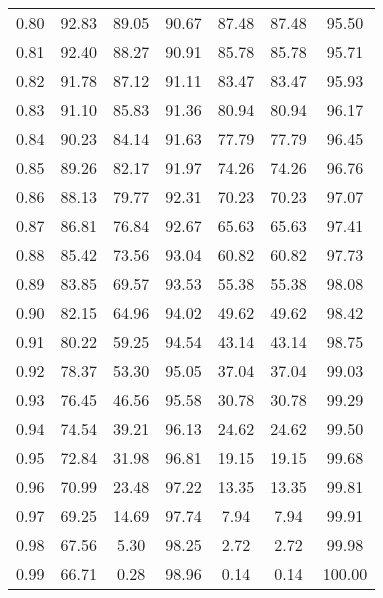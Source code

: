 \begin{tabular}{|c|c|c|c|c|c|c|}
      0.80 &     92.83 &     89.05 &      90.67 &   87.48 &      87.48 &         95.50 \\
      0.81 &     92.40 &     88.27 &      90.91 &   85.78 &      85.78 &         95.71 \\
      0.82 &     91.78 &     87.12 &      91.11 &   83.47 &      83.47 &         95.93 \\
      0.83 &     91.10 &     85.83 &      91.36 &   80.94 &      80.94 &         96.17 \\
      0.84 &     90.23 &     84.14 &      91.63 &   77.79 &      77.79 &         96.45 \\
      0.85 &     89.26 &     82.17 &      91.97 &   74.26 &      74.26 &         96.76 \\
      0.86 &     88.13 &     79.77 &      92.31 &   70.23 &      70.23 &         97.07 \\
      0.87 &     86.81 &     76.84 &      92.67 &   65.63 &      65.63 &         97.41 \\
      0.88 &     85.42 &     73.56 &      93.04 &   60.82 &      60.82 &         97.73 \\
      0.89 &     83.85 &     69.57 &      93.53 &   55.38 &      55.38 &         98.08 \\
      0.90 &     82.15 &     64.96 &      94.02 &   49.62 &      49.62 &         98.42 \\
      0.91 &     80.22 &     59.25 &      94.54 &   43.14 &      43.14 &         98.75 \\
      0.92 &     78.37 &     53.30 &      95.05 &   37.04 &      37.04 &         99.03 \\
      0.93 &     76.45 &     46.56 &      95.58 &   30.78 &      30.78 &         99.29 \\
      0.94 &     74.54 &     39.21 &      96.13 &   24.62 &      24.62 &         99.50 \\
      0.95 &     72.84 &     31.98 &      96.81 &   19.15 &      19.15 &         99.68 \\
      0.96 &     70.99 &     23.48 &      97.22 &   13.35 &      13.35 &         99.81 \\
      0.97 &     69.25 &     14.69 &      97.74 &    7.94 &       7.94 &         99.91 \\
      0.98 &     67.56 &      5.30 &      98.25 &    2.72 &       2.72 &         99.98 \\
      0.99 &     66.71 &      0.28 &      98.96 &    0.14 &       0.14 &        100.00 \\
\bottomrule
\end{tabular}

